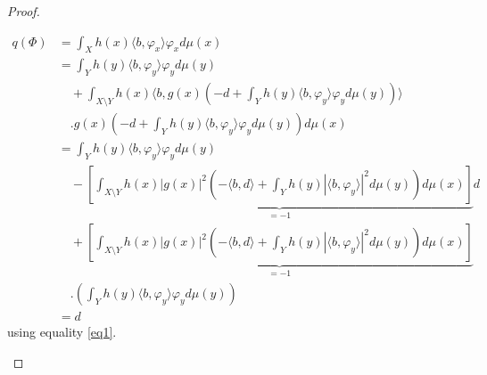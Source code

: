 \documentclass[a4paper,12pt]{article}
\theoremstyle{plain}
\theoremstyle{definition}
\theoremstyle{remark}
\begin{document}
\begin{proof}
\begin{itemize}
\begin{align*}
q(\Phi) &= \int_X h(x) \langle b , \varphi_x \rangle \varphi_x d\mu(x) \\
&= \int_Y h(y) \langle b , \varphi_y \rangle \varphi_y d\mu(y) \\ 
&\quad + \int_{X \setminus Y} h(x) \langle b , g(x)\left(-d + \int_Y h(y) \langle b , \varphi_y \rangle \varphi_y d\mu(y) \right) \rangle \\
&\quad . g(x)\left(-d + \int_Y h(y) \langle b , \varphi_y \rangle \varphi_y d\mu(y) \right) d\mu(x) \\
&= \int_Y h(y) \langle b , \varphi_y \rangle \varphi_y d\mu(y) \\
&\quad - \underbrace{\left[ \int_{X \setminus Y} h(x) |g(x)|^2 \left(-\langle b , d \rangle + \int_Y h(y) |\langle b , \varphi_y \rangle |^2 d\mu(y) \right) d\mu(x) \right]}_{=-1} d \\
&\quad + \underbrace{\left[ \int_{X \setminus Y} h(x) |g(x)|^2 \left(-\langle b , d \rangle + \int_Y h(y) |\langle b , \varphi_y \rangle |^2 d\mu(y) \right) d\mu(x) \right]}_{=-1} \\
&\quad . \left(\int_Y h(y) \langle b , \varphi_y \rangle \varphi_y d\mu(y) \right) \\
&= d
\end{align*}
using equality \ref{eq1}.


\end{itemize}
\end{proof}
\end{document}
